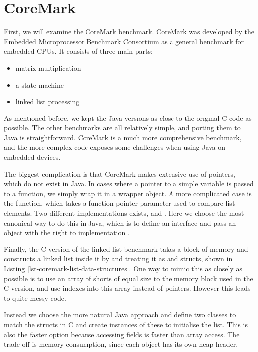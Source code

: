 \section{CoreMark}
\label{sec-evaluation-coremark}

First, we will examine the CoreMark benchmark. CoreMark was developed by the Embedded Microprocessor Benchmark Consortium as a general benchmark for embedded CPUs. It consists of three main parts:
\begin{itemize}
  \item matrix multiplication
  \item a state machine
  \item linked list processing
\end{itemize}

As mentioned before, we kept the Java versions as close to the original C code as possible. The other benchmarks are all relatively simple, and porting them to Java is straightforward. CoreMark is a much more comprehensive benchmark, and the more complex code exposes some challenges when using Java on embedded devices.

The biggest complication is that CoreMark makes extensive use of pointers, which do not exist in Java. In cases where a pointer to a simple variable is passed to a function, we simply wrap it in a wrapper object. A more complicated case is the  function, which takes a function pointer parameter  used to compare list elements. Two different implementations exists,  and . Here we choose the most canonical way to do this in Java, which is to define an interface and pass an object with the right to implementation .

Finally, the C version of the linked list benchmark takes a block of memory and constructs a linked list inside it by and treating it as  and  structs, shown in Listing \ref{lst-coremark-list-data-structures}. One way to mimic this as closely as possible is to use an array of shorts of equal size to the memory block used in the C version, and use indexes into this array instead of pointers. However this leads to quite messy code.

Instead we choose the more natural Java approach and define two classes to match the structs in C and create instances of these to initialise the list. This is also the faster option because accessing fields is faster than array access. The trade-off is memory consumption, since each object has its own heap header.

